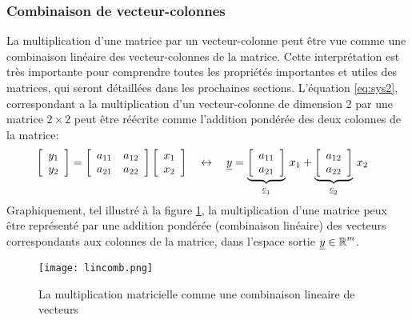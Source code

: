 \subsubsection{Combinaison de vecteur-colonnes}
\label{sec:combveccol}

La multiplication d'une matrice par un vecteur-colonne peut être vue comme une combinaison linéaire des vecteur-colonnes de la matrice. Cette interprétation est très importante pour comprendre toutes les propriétés importantes et utiles des matrices, qui seront détaillées dans les prochaines sections. L’équation \eqref{eq:sys2}, correspondant a la multiplication d'un vecteur-colonne de dimension 2 par une matrice $2\times2$ peut être réécrite comme l'addition pondérée des deux colonnes de la matrice:
%
\begin{align}
\left[ \begin{array}{c} 
	y_1 \\ y_2
\end{array} \right] &= 
\left[ \begin{array}{c c} 
a_{11} & a_{12} \\ a_{21} & a_{22}
\end{array} \right]
\left[ \begin{array}{c} 
	x_1 \\ x_2
\end{array} \right] \quad \leftrightarrow \quad  \col{y}  =   
%
\underbrace{\left[ \begin{array}{c} 
	a_{11} \\ a_{21}
\end{array} \right]}_{\col{c}_1} \, x_1 +
\underbrace{\left[ \begin{array}{c} 
	a_{12} \\ a_{22}
\end{array} \right]}_{\col{c}_2} \, x_2
\label{eq:sys2-col}
\end{align}
%
Graphiquement, tel illustré à la figure \ref{fig:lincomb}, la multiplication d'une matrice peux être représenté par une addition pondérée (combinaison linéaire) des vecteurs correspondants aux colonnes de la matrice, dans l'espace sortie $\underline{y} \in \operatorname{\mathbb{R}}^m$.

\begin{figure}[H]
	\centering
		\texttt{[image: lincomb.png]}
	\caption{La multiplication matricielle comme une combinaison lineaire de vecteurs}
	\label{fig:lincomb}
\end{figure}

